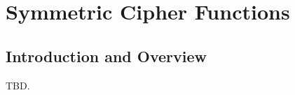 \chapter{Symmetric Cipher Functions}
\label{ccip0}

\section{Introduction and Overview}
\label{ccip0:siov0}

TBD.

